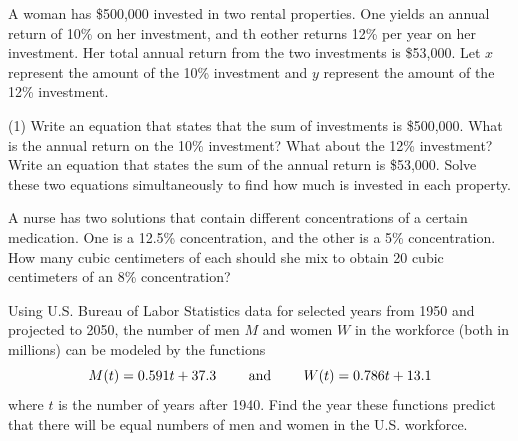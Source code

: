 \documentclass[../mathNotesPreamble]{subfiles}
\begin{document}
  \begin{ex*}
    A woman has \$500,000 invested in two rental properties. One yields an annual return of 10\% on her investment, and th eother returns 12\% per year on her investment. Her total annual return from the two investments is \$53,000. Let $x$ represent the amount of the 10\% investment and $y$ represent the amount of the 12\% investment.
  \end{ex*}
  \begin{tasks}[after-item-skip=2.5\baselineskip, label=\textbullet](1)
    \task Write an equation that states that the sum of investments is \$500,000.
    \task What is the annual return on the 10\% investment? What about the 12\% investment?
    \task Write an equation that states the sum of the annual return is \$53,000.
    \task Solve these two equations simultaneously to find how much is invested in each property.
  \end{tasks}
  \pagebreak

  \begin{ex*}
    A nurse has two solutions that contain different concentrations of a certain medication. One is a 12.5\% concentration, and the other is a 5\% concentration. How many cubic centimeters of each should she mix to obtain 20 cubic centimeters of an 8\% concentration?                
  \end{ex*}
  \pagebreak
  
  \begin{ex*}
    Using U.S. Bureau of Labor Statistics data for selected years from 1950 and projected to 2050, the number of men $M$ and women $W$ in the workforce (both in millions) can be modeled by the functions
      \[M(t)=0.591t+37.3 \hspace*{20pt}\textnormal{ and }\hspace*{20pt} W(t)=0.786t+13.1\]
    where $t$ is the number of years after 1940. Find the year these functions predict that there will be equal numbers of men and women in the U.S. workforce.
  \end{ex*}
  \begin{flushright}
  \end{flushright}
  
  \pagebreak
\end{document}
